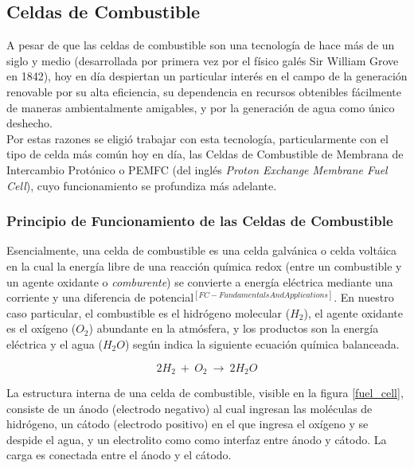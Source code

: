\subsection{Celdas de Combustible}

A pesar de que las celdas de combustible son una tecnología de hace más de un siglo y medio (desarrollada por primera vez por el físico galés Sir William Grove en 1842), hoy en día despiertan un particular interés en el campo de la generación renovable por su alta eficiencia, su dependencia en recursos obtenibles fácilmente de maneras ambientalmente amigables, y por la generación de agua como único deshecho.\\

Por estas razones se eligió trabajar con esta tecnología, particularmente con el tipo de celda más común hoy en día, las Celdas de Combustible de Membrana de Intercambio Protónico o PEMFC (del inglés \textit{Proton Exchange Membrane Fuel Cell}), cuyo funcionamiento se profundiza más adelante.\\

\subsubsection{Principio de Funcionamiento de las Celdas de Combustible}

Esencialmente, una celda de combustible es una celda galvánica o celda voltáica en la cual la energía libre de una reacción química redox (entre un combustible y un agente oxidante o \textit{comburente}) se convierte a energía eléctrica mediante una corriente y una diferencia de potencial$^{[FC-FundamentalsAndApplications]}$. En nuestro caso particular, el combustible es el hidrógeno molecular ($H_2$), el agente oxidante es el oxígeno ($O_2$) abundante en la atmósfera, y los productos son la energía eléctrica y el agua ($H_2O$) según indica la siguiente ecuación química balanceada.

\begin{equation}\label{redox_celda}
    2H_2\ +\ O_2\ \longrightarrow\ 2H_2O
\end{equation}

La estructura interna de una celda de combustible, visible en la figura \ref{fuel_cell}, consiste de un ánodo (electrodo negativo) al cual ingresan las moléculas de hidrógeno, un cátodo (electrodo positivo) en el que ingresa el oxígeno y se despide el agua, y un electrolito como como interfaz entre ánodo y cátodo. La carga es conectada entre el ánodo y el cátodo.

